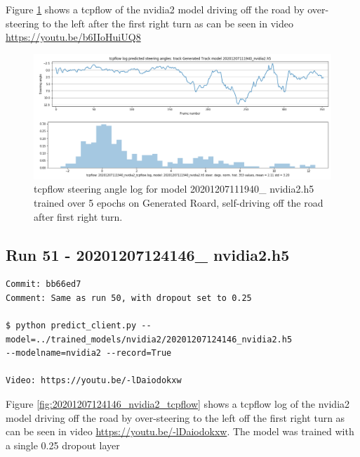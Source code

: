 Figure \ref{fig:20201207111940_nvidia2_tcpflow} shows a tcpflow of the nvidia2 model driving off the road by over-steering to the left after the first right turn as can be seen in video \url{https://youtu.be/b6IIoHuiUQ8} 

\begin{figure}[ht]
 \centering 
 \includegraphics[width=\textwidth]{Figures/20201207111940_nvidia2_tcpflow.png}
 \caption{tcpflow steering angle log for model 20201207111940\_ nvidia2.h5 trained over 5 epochs on Generated Roard, self-driving off the road after first right turn.}
 \label{fig:20201207111940_nvidia2_tcpflow}
\end{figure}

\subsection{Run 51 - 20201207124146\_ nvidia2.h5 }
\label{app_res:51}
\begin{verbatim}
Commit: bb66ed7
Comment: Same as run 50, with dropout set to 0.25

$ python predict_client.py --model=../trained_models/nvidia2/20201207124146_nvidia2.h5
--modelname=nvidia2 --record=True

Video: https://youtu.be/-lDaiodokxw

\end{verbatim}

Figure \ref{fig:20201207124146_nvidia2_tcpflow} shows a tcpflow log of the nvidia2 model driving off the road by over-steering to the left off the first right turn as can be seen in video \url{https://youtu.be/-lDaiodokxw}. The model was trained with a single 0.25 dropout layer

